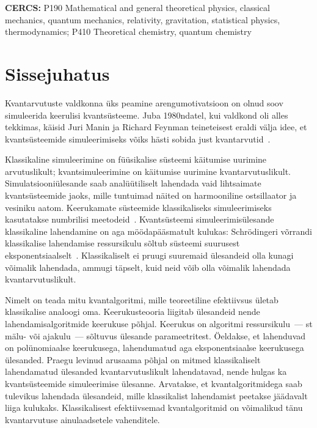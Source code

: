 \documentclass[12pt]{report}
\begin{document}
\noindent\textbf{CERCS:}
P190 Mathematical and general theoretical physics, classical mechanics, quantum
mechanics, relativity, gravitation, statistical physics, thermodynamics; P410 Theoretical chemistry, quantum chemistry

\tableofcontents

\chapter{Sissejuhatus}

Kvantarvutuste valdkonna üks peamine arengumotivatsioon on olnud soov simuleerida keerulisi kvantsüsteeme.
Juba 1980ndatel, kui valdkond oli alles tekkimas, käisid Juri Manin ja Richard Feynman teineteisest eraldi välja idee, et kvantsüsteemide simuleerimiseks võiks hästi sobida just kvantarvutid~\cite{manin, feynman}.

Klassikaline simuleerimine on füüsikalise süsteemi käitumise uurimine arvutuslikult; kvantsimuleerimine on käitumise uurimine kvantarvutuslikult.
Simulatsiooniülesande saab analüütiliselt lahendada vaid lihtsaimate kvantsüsteemide jaoks, mille tuntuimad näited on harmooniline ostsillaator ja vesiniku aatom.
Keerukamate süsteemide klassikaliseks simuleerimiseks kasutatakse numbrilisi meetodeid~\cite{szabo+ostlund, whitfield+etal2011}.
Kvantsüsteemi simuleerimisülesande klassikaline lahendamine on aga möödapääsmatult kulukas: Schrödingeri võrrandi klassikalise lahendamise ressursikulu sõltub süsteemi suurusest eksponentsiaalselt~\cite{whitfield+etal2011, mcardle+etal, cao+etal, kassal+etal}.
Klassikaliselt ei pruugi suuremaid ülesandeid olla kunagi võimalik lahendada, ammugi täpselt, kuid neid võib olla võimalik lahendada kvantarvutuslikult.

Nimelt on teada mitu kvantalgoritmi, mille teoreetiline efektiivsus ületab klassikalise analoogi oma.
Keerukusteooria liigitab ülesandeid nende lahendamisalgoritmide keerukuse põhjal.
Keerukus on algoritmi ressursikulu~--- st mälu- või ajakulu~--- sõltuvus ülesande parameetritest.
Öeldakse, et lahenduvad on polünomiaalse keerukusega, lahendumatud aga eksponentsiaalse keerukusega ülesanded.
Praegu levinud arusaama põhjal on mitmed klassikaliselt lahendamatud ülesanded kvantarvutuslikult lahendatavad, nende hulgas ka kvantsüsteemide simuleerimise ülesanne.
Arvatakse, et kvantalgoritmidega saab tulevikus lahendada ülesandeid, mille klassikalist lahendamist peetakse jäädavalt liiga kulukaks.
Klassikalisest efektiivsemad kvantalgoritmid on võimalikud tänu kvantarvutuse ainulaadsetele vahenditele.
\end{document}
